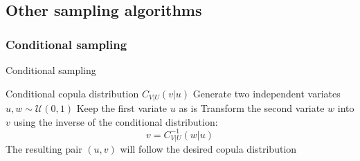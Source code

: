 \documentclass[12pt,a4paper]{article}
\begin{document}
\subsection{Other sampling algorithms}

\subsubsection{Conditional sampling}

\begin{algorithm}[H]
\caption{Conditional sampling}
\begin{algorithmic}[1]
\Require Conditional copula distribution $C_{V|U}(v|u)$
\State Generate two independent variates $u,w\sim \mathcal U(0,1)$
\State Keep the first variate $u$ as is
\State Transform the second variate $w$ into $v$ using the inverse of the conditional distribution:
$$v = C^{-1}_{V|U}(w|u)$$
\Ensure The resulting pair $(u,v)$ will follow the desired copula distribution
\end{algorithmic}
\end{algorithm}

\end{document}
